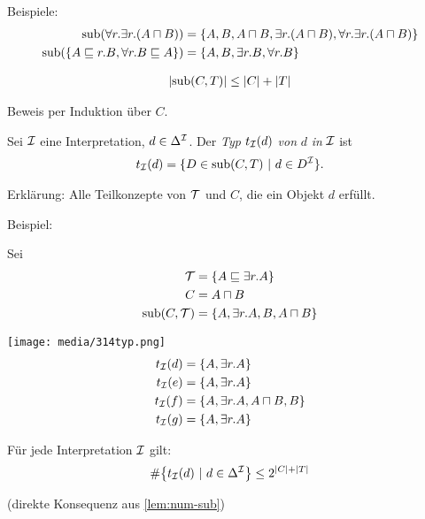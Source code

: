 \begin{tafel}
Beispiele:
\begin{align*}
    \operatorname{sub}(\forall r.\exists r.(A \sqcap B)) &= \{A,B,A \sqcap B, \exists r.(A \sqcap B), \forall r.\exists r.(A \sqcap B)\}\\
    \operatorname{sub}(\{A \sqsubseteq r.B, \forall r.B \sqsubseteq A\}) &= \{A,B, \exists r.B, \forall r.B\}
\end{align*}
\end{tafel}

\begin{lemma}
    \label{lem:num-sub}
    \begin{align*}
\left| \sub\left( C,T \right) \right| \leq \left| C \right| + \left| T \right|
\end{align*}
\end{lemma}
Beweis per Induktion über $C$.

\begin{definition}
Sei $\mathcal{I}$ eine Interpretation, $d \in \Delta^{\mathcal{I}}$. Der \emph{Typ}
$t_\MI\left( d \right)$ \emph{von} $d$ \emph{in} $\mathcal{I}$ ist
\begin{align*}
t_\MI\left( d \right) = \left\{ D \in \sub\left( C,T \right)\  \right|\ d \in D^\MI\}.
\end{align*}
\end{definition}
Erklärung: Alle Teilkonzepte von $\mathcal{T}$ und $C$, die ein Objekt $d$
erfüllt.

\begin{tafel}
    \label{t:typen}
Beispiel:

Sei
\begin{align*}
    \mathcal{T} &=\{A \sqsubseteq \exists r.A\}\\
    C &= A \sqcap B\\
    \operatorname{sub}(C,\mathcal{T}) &= \{A, \exists r.A, B, A \sqcap B\}
\end{align*}

\texttt{[image: media/314typ.png]}
\begin{align*}
    t_{\mathcal{I}}(d)&=\{A, \exists r.A\}\\
    t_{\mathcal{I}}(e)&=\{A, \exists r.A\}\\
    t_{\mathcal{I}}(f)&=\{A, \exists r.A, A \sqcap B, B\}\\
    t_{\mathcal{I}}(g)&=\{A, \exists r.A\}
\end{align*}
\end{tafel}

\begin{lemma}
    \label{lem:num-typ}
Für jede Interpretation $\mathcal{I}$ gilt:
\begin{align*}
\#\left\{ t_\MI\left( d \right)\ |\ d \in \Delta^\MI \right\} \leq 2^{\left| C \right| + |T|}
\end{align*}
\end{lemma}
(direkte Konsequenz aus \autoref{lem:num-sub})

